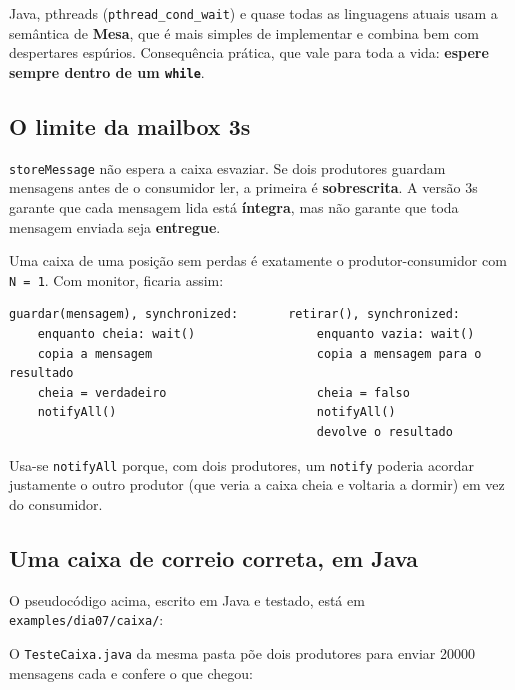 \documentclass[11pt,a4paper]{article}
\newcommand{\raiz}{../../../..}
\newcommand{\cmd}[1]{\texttt{#1}}
\begin{document}
Java, pthreads (\cmd{pthread\_cond\_wait}) e quase todas as linguagens atuais usam a semântica de \textbf{Mesa}, que é mais simples de implementar e combina bem com despertares espúrios. Consequência prática, que vale para toda a vida: \textbf{espere sempre dentro de um \cmd{while}}.

\subsection{O limite da mailbox 3s}

\begin{alerta}
\cmd{storeMessage} não espera a caixa esvaziar. Se dois produtores guardam mensagens antes de o consumidor ler, a primeira é \textbf{sobrescrita}. A versão 3s garante que cada mensagem lida está \textbf{íntegra}, mas não garante que toda mensagem enviada seja \textbf{entregue}.
\end{alerta}

Uma caixa de uma posição sem perdas é exatamente o produtor-consumidor com \cmd{N = 1}. Com monitor, ficaria assim:

\begin{lstlisting}[style=terminal]
guardar(mensagem), synchronized:       retirar(), synchronized:
    enquanto cheia: wait()                 enquanto vazia: wait()
    copia a mensagem                       copia a mensagem para o resultado
    cheia = verdadeiro                     cheia = falso
    notifyAll()                            notifyAll()
                                           devolve o resultado
\end{lstlisting}

Usa-se \cmd{notifyAll} porque, com dois produtores, um \cmd{notify} poderia acordar justamente o outro produtor (que veria a caixa cheia e voltaria a dormir) em vez do consumidor.

\subsection{Uma caixa de correio correta, em Java}

O pseudocódigo acima, escrito em Java e testado, está em \cmd{examples/dia07/caixa/}:



O \cmd{TesteCaixa.java} da mesma pasta põe dois produtores para enviar 20000 mensagens cada e confere o que chegou:
\end{document}
